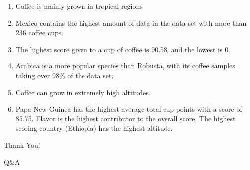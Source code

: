 \documentclass[
]{article}
\providecommand{\tightlist}{%
  \setlength{\itemsep}{0pt}\setlength{\parskip}{0pt}}
\begin{document}
\begin{enumerate}
\def\labelenumi{\arabic{enumi}.}
\tightlist
\item
  Coffee is mainly grown in tropical regions
\item
  Mexico contains the highest amount of data in the data set with more
  than 236 coffee cups.
\item
  The highest score given to a cup of coffee is 90.58, and the lowest is
  0.
\item
  Arabica is a more popular species than Robusta, with its coffee
  samples taking over 98\% of the data set.
\item
  Coffee can grow in extremely high altitudes.
\item
  Papa New Guinea has the highest average total cup points with a score
  of 85.75. Flavor is the highest contributor to the overall score. The
  highest scoring country (Ethiopia) has the highest altitude.
\end{enumerate}

Thank You!

Q\&A
\end{document}
